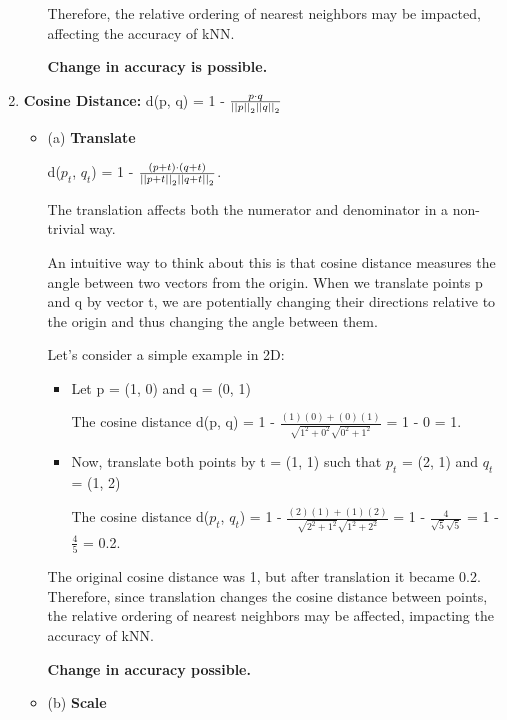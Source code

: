 \documentclass[fleqn]{article}
\begin{document}
\begin{enumerate}
\begin{itemize}
		            Therefore, the relative ordering of nearest neighbors may be impacted, affecting the accuracy of kNN.

		            \textbf{Change in accuracy is possible.}
	      \end{itemize}

	\item \textbf{Cosine Distance:} d(p, q) = 1 - $\frac{p \cdot q}{\left\vert\left\vert p \right\vert\right\vert_2 \left\vert\left\vert q \right\vert\right\vert_2}$
	      \begin{itemize}
		      \item (a) \textbf{Translate}

		            d($p_t$, $q_t$) = 1 - $\frac{(p + t) \cdot (q + t)}{\left\vert\left\vert p + t \right\vert\right\vert_2 \left\vert\left\vert q + t \right\vert\right\vert_2}$.

		            The translation affects both the numerator and denominator in a non-trivial way.

		            An intuitive way to think about this is that cosine distance measures the angle between two vectors from the origin.
		            When we translate points p and q by vector t, we are potentially changing their directions relative to the origin and thus changing the angle between them.

		            Let's consider a simple example in 2D:
		            \begin{itemize}
			            \item Let p = (1, 0) and q = (0, 1)

			                  The cosine distance d(p, q) = 1 - $\frac{(1)(0) + (0)(1)}{\sqrt{1^2 + 0^2} \sqrt{0^2 + 1^2}}$ = 1 - 0 = 1.
			            \item Now, translate both points by t = (1, 1) such that $p_t$ = (2, 1) and $q_t$ = (1, 2)

			                  The cosine distance d($p_t$, $q_t$) = 1 - $\frac{(2)(1) + (1)(2)}{\sqrt{2^2 + 1^2} \sqrt{1^2 + 2^2}}$ = 1 - $\frac{4}{\sqrt{5} \sqrt{5}}$ = 1 - $\frac{4}{5}$ = 0.2.
		            \end{itemize}

		            The original cosine distance was 1, but after translation it became 0.2.
		            Therefore, since translation changes the cosine distance between points, the relative ordering of nearest neighbors may be affected, impacting the accuracy of kNN.

		            \textbf{Change in accuracy possible.}

		      \item (b) \textbf{Scale}


\end{itemize}
\end{enumerate}
\end{document}
